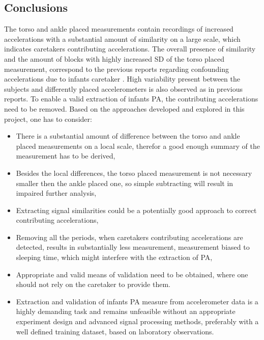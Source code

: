 \documentclass{article}
\begin{document}
{\subsection{Conclusions}
The torso and ankle placed measurements contain recordings of increased accelerations with a substantial amount of similarity on a large scale, which indicates caretakers contributing accelerations. The overall presence of similarity and the amount of blocks with highly increased SD of the torso placed measurement, correspond to the previous reports regarding confounding accelerations due to infants caretaker \cite{ref1}\cite{ref5}\cite{ref6}. High variability present between the subjects and differently placed accelerometers is also observed as in previous reports. To enable a valid extraction of infants PA, the contributing accelerations need to be removed. Based on the approaches developed and explored in this project, one has to consider:
\begin{itemize}
\item There is a substantial amount of difference between the torso and ankle placed measurements on a local scale, therefor a good enough summary of the measurement has to be derived,
\item Besides the local differences, the torso placed measurement is not necessary smaller then the ankle placed one, so simple subtracting will result in impaired further analysis,
\item Extracting signal similarities could be a potentially good approach to correct contributing accelerations,
\item Removing all the periods, when caretakers contributing accelerations are detected, results in substantially less measurement, measurement biased to sleeping time, which might interfere with the extraction of PA,
\item Appropriate and valid means of validation need to be obtained, where one should not rely on the caretaker to provide them.
\item Extraction and validation of infants PA measure from accelerometer data is a highly demanding task and remains unfeasible without an appropriate experiment design and advanced signal processing methods, preferably with a well defined training dataset, based on laboratory observations.
\end{itemize}

}
\end{document}
